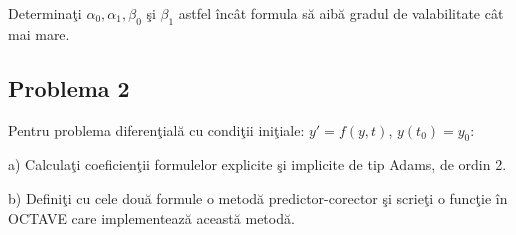 \documentclass{exam}
\begin{document}
Determinaţi $\alpha_{0}, \alpha_{1}, \beta_{0}$ şi $\beta_{1}$ astfel încât formula să aibă gradul de valabilitate cât mai mare.


\subsection{Problema 2}
Pentru problema diferenţială cu condiţii iniţiale: $y{'} = f(y, t)$, $y(t_{0}) = y_{0}$:

a) Calculaţi coeficienţii formulelor explicite şi implicite de tip Adams, de ordin 2.

b) Definiţi cu cele două formule o metodă predictor-corector şi scrieţi o funcţie în OCTAVE care implementează această metodă.



\end{document}
